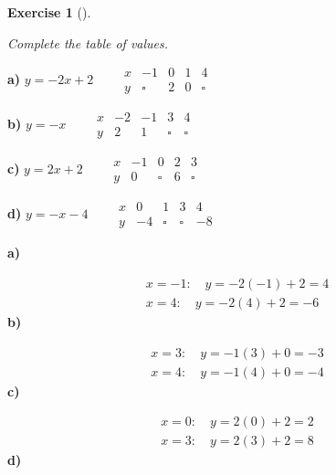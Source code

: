 \documentclass[
  letterpaper,
  DIV=11,
  numbers=noendperiod]{scrreprt}
\theoremstyle{definition}
\newtheorem{exercise}{Exercise}[chapter]
\theoremstyle{remark}
\begin{document}
\begin{exercise}[]\protect\hypertarget{exr-u7-4}{}\label{exr-u7-4}

\emph{Complete the table of values.}

\textbf{a)}
\(\displaystyle y = -2x + 2 \qquad \begin{array}{c|cccc} x & -1 & 0 & 1 & 4 \\ \hline y & \square & 2 & 0 & \square \end{array}\)

\textbf{b)}
\(\displaystyle y = -x \qquad \begin{array}{c|cccc} x & -2 & -1 & 3 & 4 \\ \hline y & 2 & 1 & \square & \square \end{array}\)

\textbf{c)}
\(\displaystyle y = 2x + 2 \qquad \begin{array}{c|cccc} x & -1 & 0 & 2 & 3 \\ \hline y & 0 & \square & 6 & \square \end{array}\)

\textbf{d)}
\(\displaystyle y = -x - 4 \qquad \begin{array}{c|cccc} x & 0 & 1 & 3 & 4 \\ \hline y & -4 & \square & \square & -8 \end{array}\)

\begin{tcolorbox}[enhanced jigsaw, opacitybacktitle=0.6, coltitle=black, arc=.35mm, colframe=quarto-callout-tip-color-frame, colback=white, bottomrule=.15mm, left=2mm, colbacktitle=quarto-callout-tip-color!10!white, titlerule=0mm, opacityback=0, title=\textcolor{quarto-callout-tip-color}{\faLightbulb}\hspace{0.5em}{🔍 View Solutions}, leftrule=.75mm, breakable, rightrule=.15mm, bottomtitle=1mm, toptitle=1mm, toprule=.15mm]

\textbf{a)}

\[
\begin{aligned}
x = -1: \quad y = -2(-1) + 2 = 4 \\[4pt] x = 4: \quad y = -2(4) + 2 = -6
\end{aligned}
\] \textbf{b)}

\[
\begin{aligned}
x = 3: \quad y = -1(3) + 0 = -3 \\[4pt] x = 4: \quad y = -1(4) + 0 = -4
\end{aligned}
\] \textbf{c)}

\[
\begin{aligned}
x = 0: \quad y = 2(0) + 2 = 2 \\[4pt] x = 3: \quad y = 2(3) + 2 = 8
\end{aligned}
\] \textbf{d)}


\end{tcolorbox}
\end{exercise}
\end{document}
